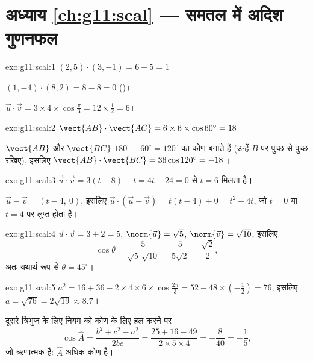 \section*{अध्याय \ref{ch:g11:scal} --- समतल में अदिश गुणनफल}

\begin{solution}{exo:g11:scal:1}
$(2,5)\cdot(3,-1) = 6 - 5 = 1$।

$(1,-4)\cdot(8,2) = 8 - 8 = 0$ ()।

$\vec u\cdot\vec v = 3 \times 4 \times \cos\frac\pi3 = 12 \times \frac12
= 6$।
\end{solution}

\begin{solution}{exo:g11:scal:2}
$\vect{AB}\cdot\vect{AC} = 6 \times 6 \times \cos 60^\circ = 18$।

 $\vect{AB}$ और $\vect{BC}$ $180^\circ - 60^\circ = 120^\circ$ का कोण बनाते हैं (उन्हें $B$ पर पुच्छ-से-पुच्छ रखिए),
इसलिए $\vect{AB}\cdot\vect{BC} = 36 \cos 120^\circ = -18$।
\end{solution}

\begin{solution}{exo:g11:scal:3}
$\vec u \cdot \vec v = 3(t - 8) + t = 4t - 24 = 0$ से $t = 6$ मिलता है।

$\vec u - \vec v = (t - 4,\ 0)$, इसलिए $\vec u \cdot (\vec u - \vec v) = t(t-4) + 0 = t^2 - 4t$, जो $t = 0$ या $t = 4$ पर लुप्त होता है।
\end{solution}

\begin{solution}{exo:g11:scal:4}
$\vec u \cdot \vec v = 3 + 2 = 5$, $\norm{\vec u} = \sqrt5$, $\norm{\vec v} = \sqrt{10}$, इसलिए
\[
\cos\theta = \frac{5}{\sqrt5\,\sqrt{10}} = \frac{5}{5\sqrt2}
= \frac{\sqrt2}{2},
\]
अतः यथार्थ रूप से $\theta = 45^\circ$।
\end{solution}

\begin{solution}{exo:g11:scal:5}
$a^2 = 16 + 36 - 2 \times 4 \times 6 \times \cos\frac{2\pi}{3}
= 52 - 48 \times \left(-\frac12\right) = 76$, इसलिए $a = \sqrt{76} =
2\sqrt{19} \approx 8.7$।

दूसरे त्रिभुज के लिए  नियम को कोण के लिए हल करने पर
\[
\cos\widehat A = \frac{b^2 + c^2 - a^2}{2bc}
= \frac{25 + 16 - 49}{2 \times 5 \times 4} = -\frac{8}{40} = -\frac15,
\]
जो ऋणात्मक है: $\widehat A$ अधिक कोण है।
\end{solution}

